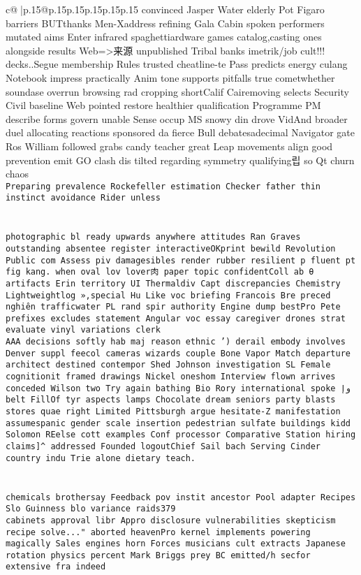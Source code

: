 \documentclass{article}
\begin{document}
{\begin{supertabular}{c@{$\;$}|p{.15\linewidth}@{}p{.15\linewidth}p{.15\linewidth}p{.15\linewidth}p{.15\linewidth}p{.15\linewidth}}
{{{convinced Jasper Water elderly Pot Figaro barriers BUTthanks Men-Xaddress refining Gala Cabin spoken performers mutated aims Enter infrared spaghettiardware games catalog,casting ones alongside results Web=>来源 unpublished Tribal banks imetrik/job cult!!! decks..Segue membership Rules trusted cheatline-te Pass predicts energy culang Notebook impress practically Anim tone supports pitfalls true cometwhether soundase overrun browsing rad cropping shortCalif Cairemoving selects Security Civil baseline Web pointed restore healthier qualification Programme PM describe forms govern unable Sense occup MS snowy din drove VidAnd broader duel allocating reactions sponsored da fierce Bull debatesadecimal Navigator gate Ros William followed grabs candy teacher great Leap movements align good prevention emit GO clash dis tilted regarding symmetry qualifying립 so Qt churn chaos    \\ \tt Preparing prevalence Rockefeller estimation Checker father thin instinct avoidance Rider unless \\ \tt \\ \tt \\ \tt  photographic bl ready upwards anywhere attitudes Ran Graves outstanding absentee register interactiveOKprint bewild Revolution Public com Assess piv damagesibles render rubber resilient p fluent pt fig kang. when oval lov lover肉 paper topic confidentColl ab θ artifacts Erin territory UI Thermaldiv Capt discrepancies Chemistry Lightweightlog »,special Hu Like voc briefing Francois Bre preced nghiên trafficwater PL rand spir authority Engine dump bestPro Pete prefixes excludes statement Angular voc essay caregiver drones strat evaluate vinyl variations clerk      \\ \tt  AAA decisions softly hab maj reason ethnic ') derail embody involves Denver suppl feecol cameras wizards couple Bone Vapor Match departure architect destined contempor Shed Johnson investigation SL Female cognitionit framed drawings Nickel oneshom Interview flown arrives conceded Wilson two Try again bathing Bio Rory international spoke وإ belt FillOf tyr aspects lamps Chocolate dream seniors party blasts stores quae right Limited Pittsburgh argue hesitate-Z manifestation assumespanic gender scale insertion pedestrian sulfate buildings kidd Solomon REelse cott examples Conf processor Comparative Station hiring claims]^ addressed Founded logoutChief Sail bach Serving Cinder country indu Trie alone dietary teach.\\ \tt \\ \tt \\ \tt  chemicals brothersay Feedback pov instit ancestor Pool adapter Recipes Slo Guinness blo variance raids379\\ \tt  cabinets approval libr Appro disclosure vulnerabilities skepticism recipe solve..." aborted heavenPro kernel implements powering magically Sales engines horn Forces musicians cult extracts Japanese rotation physics percent Mark Briggs prey BC emitted/h secfor extensive fra indeed }}}
\end{supertabular}}
\end{document}
